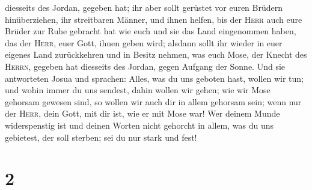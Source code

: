 diesseits des Jordan, gegeben hat; ihr aber sollt gerüstet vor euren
Brüdern hinüberziehen, ihr streitbaren Männer, und ihnen helfen,
 bis der \textsc{Herr} auch eure Brüder zur Ruhe gebracht
hat wie euch und sie das Land eingenommen haben, das der \textsc{Herr},
euer Gott, ihnen geben wird; alsdann sollt ihr wieder in euer eigenes
Land zurückkehren und in Besitz nehmen, was euch Mose, der Knecht des
\textsc{Herrn}, gegeben hat diesseits des Jordan, gegen Aufgang der
Sonne.  Und sie antworteten Josua und sprachen: Alles,
was du uns geboten hast, wollen wir tun; und wohin immer du uns sendest,
dahin wollen wir gehen;  wie wir Mose gehorsam gewesen
sind, so wollen wir auch dir in allem gehorsam sein; wenn nur der
\textsc{Herr}, dein Gott, mit dir ist, wie er mit Mose war!
 Wer deinem Munde widerspenstig ist und deinen Worten
nicht gehorcht in allem, was du uns gebietest, der soll sterben; sei du
nur stark und fest!

\hypertarget{section-1}{%
\section{2}\label{section-1}}

